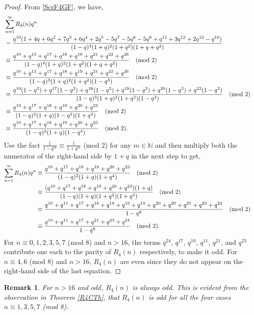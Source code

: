 \documentclass[12pt,reqno]{amsart}
\numberwithin{equation}{section}
\theoremstyle{plain}
\newtheorem{remark}[]{Remark}
\begin{document}
	\begin{proof}
		From \eqref{ScrF4GF}, we have,
		\begin{align*}
			&\sum_{n=1}^{\infty} R_4(n) q^n \notag \\
			&= \frac{q^{10}(1+4q+6q^2+7q^3+6q^4+2q^5-5q^7-5q^8-5q^9+q^{11}+3q^{12}+2q^{13}-q^{16})}{(1-q)^4(1+q)^2(1+q^2)(1+q+q^2)} \\
			&\equiv \frac{q^{10}+q^{13}+q^{17}+q^{18}+q^{19}+q^{21}+q^{22}+q^{26}}{(1-q)^4(1+q)^2(1+q^2)(1+q+q^2)}   \quad \textup{(mod 2)} \\
			&\equiv \frac{q^{10}+q^{13}+q^{17}+q^{18}+q^{19}+q^{21}+q^{22}+q^{26}}{(1-q)^3(1+q)^2(1+q^2)(1-q^3)}   \quad \textup{(mod 2)} \\
			&\equiv \frac{q^{10}(1-q^3)+q^{17}(1-q^3)+q^{18}(1-q^3)+q^{19}(1-q^3)+q^{20}(1-q^3)+q^{23}(1-q^3)}{(1-q)^3(1+q)^2(1+q^2)(1-q^3)}   \quad \textup{(mod 2)} \\
			&\equiv \frac{q^{10}+q^{17}+q^{18}+q^{19}+q^{20}+q^{23}}{(1-q)^2(1+q)(1-q^2)(1+q^2)}  \quad \textup{(mod 2)} \\
			&\equiv \frac{q^{10}+q^{17}+q^{18}+q^{19}+q^{20}+q^{23}}{(1-q)^2(1+q)(1-q^4)}  \quad \textup{(mod 2)}.
		\end{align*}
		Use the fact $\frac{1}{1-q^m} \equiv \frac{1}{1+q^m}$ (mod 2) for any $m \in \mathbb{N}$ and then multiply both the numerator of the right-hand side by $1+q$ in the next step to get,
		\begin{align*}
			\sum_{n=1}^{\infty} R_4(n) q^n &\equiv \frac{q^{10}+q^{17}+q^{18}+q^{19}+q^{20}+q^{23}}{(1-q)^2(1+q)(1+q^4)}  \quad \textup{(mod 2)} \\
			&\equiv \frac{(q^{10}+q^{17}+q^{18}+q^{19}+q^{20}+q^{23})(1+q)}{(1-q)(1+q)(1+q^2)(1+q^4)}  \quad \textup{(mod 2)} \\
			&\equiv \frac{q^{10}+q^{11}+q^{17}+q^{18}+q^{18}+q^{19}+q^{19}+q^{20}+q^{20}+q^{21}+q^{23}+q^{24}}{1-q^8} \quad \textup{(mod 2)} \\
			&\equiv \frac{q^{10}+q^{11}+q^{17}+q^{21}+q^{23}+q^{24}}{1-q^8} \quad \textup{(mod 2)}.
		\end{align*}
		For $n \equiv 0,1,2,3,5,7$ (mod 8) and $n>16$, the terms $q^{24}$, $q^{17}$, $q^{10}$, $q^{11}$, $q^{21}$, and $q^{23}$ contribute one each to the parity of $R_4(n)$ respectively, to make it odd. For $n \equiv 4,6$ (mod 8) and $n>16$, $R_4(n)$ are even since they do not appear on the right-hand side of the last equation.
	\end{proof}
	\begin{remark}
		For $n>16$ and $odd$, $R_4(n)$ is always odd. This is evident from the observation in Theorem \eqref{R4CTh}, that $R_4(n)$ is odd for all the four cases $n \equiv 1,3,5,7$ \textup{(mod 8)}.
	\end{remark}
\end{document}
